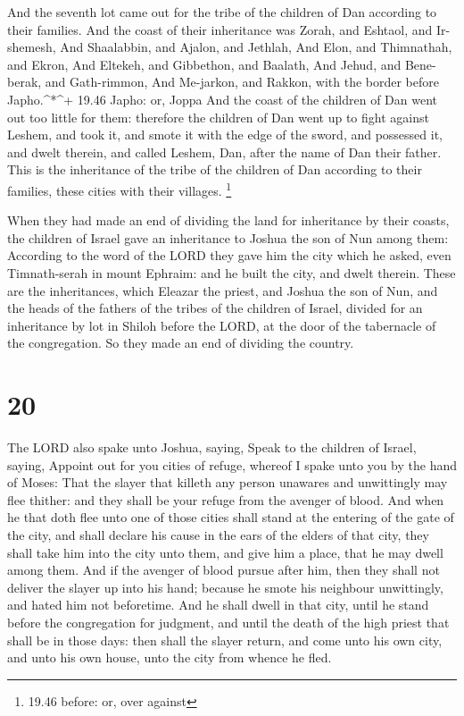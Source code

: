  And the seventh lot came out for the tribe of the children
of Dan according to their families.  And the coast of their
inheritance was Zorah, and Eshtaol, and Ir-shemesh,  And
Shaalabbin, and Ajalon, and Jethlah,  And Elon, and
Thimnathah, and Ekron,  And Eltekeh, and Gibbethon, and
Baalath,  And Jehud, and Bene-berak, and Gath-rimmon,
 And Me-jarkon, and Rakkon, with the border before
Japho.\^{}*\^{}+ 19.46 Japho: or, Joppa  And the coast of
the children of Dan went out too little for them: therefore the children
of Dan went up to fight against Leshem, and took it, and smote it with
the edge of the sword, and possessed it, and dwelt therein, and called
Leshem, Dan, after the name of Dan their father.  This is
the inheritance of the tribe of the children of Dan according to their
families, these cities with their villages. \footnote{19.46 before: or,
  over against}

 When they had made an end of dividing the land for
inheritance by their coasts, the children of Israel gave an inheritance
to Joshua the son of Nun among them:  According to the word
of the LORD they gave him the city which he asked, even Timnath-serah in
mount Ephraim: and he built the city, and dwelt therein. 
These are the inheritances, which Eleazar the priest, and Joshua the son
of Nun, and the heads of the fathers of the tribes of the children of
Israel, divided for an inheritance by lot in Shiloh before the LORD, at
the door of the tabernacle of the congregation. So they made an end of
dividing the country.

\hypertarget{section-19}{%
\section{20}\label{section-19}}

 The LORD also spake unto Joshua, saying,  Speak
to the children of Israel, saying, Appoint out for you cities of refuge,
whereof I spake unto you by the hand of Moses:  That the
slayer that killeth any person unawares and unwittingly may flee
thither: and they shall be your refuge from the avenger of blood.
 And when he that doth flee unto one of those cities shall
stand at the entering of the gate of the city, and shall declare his
cause in the ears of the elders of that city, they shall take him into
the city unto them, and give him a place, that he may dwell among them.
 And if the avenger of blood pursue after him, then they
shall not deliver the slayer up into his hand; because he smote his
neighbour unwittingly, and hated him not beforetime.  And he
shall dwell in that city, until he stand before the congregation for
judgment, and until the death of the high priest that shall be in those
days: then shall the slayer return, and come unto his own city, and unto
his own house, unto the city from whence he fled.

